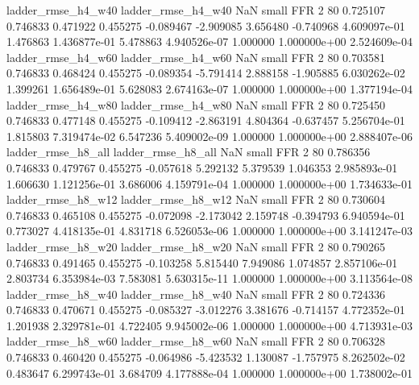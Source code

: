       ladder_rmse_h4_w40       ladder_rmse_h4_w40                   NaN      small      FFR                 2 80 0.725107       0.746833 0.471922       0.455275   -0.089467     -2.909085      3.656480    -0.740968   4.609097e-01  1.476863 1.436877e-01     5.478863   4.940526e-07            1.000000    1.000000e+00        2.524609e-04
      ladder_rmse_h4_w60       ladder_rmse_h4_w60                   NaN      small      FFR                 2 80 0.703581       0.746833 0.468424       0.455275   -0.089354     -5.791414      2.888158    -1.905885   6.030262e-02  1.399261 1.656489e-01     5.628083   2.674163e-07            1.000000    1.000000e+00        1.377194e-04
      ladder_rmse_h4_w80       ladder_rmse_h4_w80                   NaN      small      FFR                 2 80 0.725450       0.746833 0.477148       0.455275   -0.109412     -2.863191      4.804364    -0.637457   5.256704e-01  1.815803 7.319474e-02     6.547236   5.409002e-09            1.000000    1.000000e+00        2.888407e-06
      ladder_rmse_h8_all       ladder_rmse_h8_all                   NaN      small      FFR                 2 80 0.786356       0.746833 0.479767       0.455275   -0.057618      5.292132      5.379539     1.046353   2.985893e-01  1.606630 1.121256e-01     3.686006   4.159791e-04            1.000000    1.000000e+00        1.734633e-01
      ladder_rmse_h8_w12       ladder_rmse_h8_w12                   NaN      small      FFR                 2 80 0.730604       0.746833 0.465108       0.455275   -0.072098     -2.173042      2.159748    -0.394793   6.940594e-01  0.773027 4.418135e-01     4.831718   6.526053e-06            1.000000    1.000000e+00        3.141247e-03
      ladder_rmse_h8_w20       ladder_rmse_h8_w20                   NaN      small      FFR                 2 80 0.790265       0.746833 0.491465       0.455275   -0.103258      5.815440      7.949086     1.074857   2.857106e-01  2.803734 6.353984e-03     7.583081   5.630315e-11            1.000000    1.000000e+00        3.113564e-08
      ladder_rmse_h8_w40       ladder_rmse_h8_w40                   NaN      small      FFR                 2 80 0.724336       0.746833 0.470671       0.455275   -0.085327     -3.012276      3.381676    -0.714157   4.772352e-01  1.201938 2.329781e-01     4.722405   9.945002e-06            1.000000    1.000000e+00        4.713931e-03
      ladder_rmse_h8_w60       ladder_rmse_h8_w60                   NaN      small      FFR                 2 80 0.706328       0.746833 0.460420       0.455275   -0.064986     -5.423532      1.130087    -1.757975   8.262502e-02  0.483647 6.299743e-01     3.684709   4.177888e-04            1.000000    1.000000e+00        1.738002e-01
